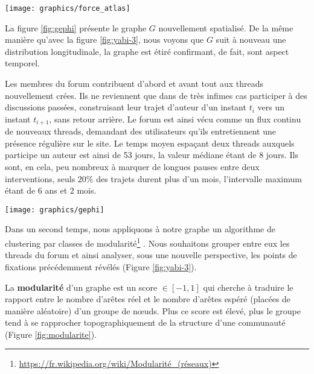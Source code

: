 \documentclass[symmetric,justified,marginals=raggedouter]{tufte-book}
\begin{document}
\begin{marginfigure}%
  \texttt{[image: graphics/force\_atlas]}
  \vspace*{0.2cm}  
  \caption{Principe de base de Force Atlas, les noeuds d'un graphe sont chargés d'une force de répulsion et les arcs d'une force d'attraction}
  \label{fig:force_atlas}
\end{marginfigure} 

La figure \ref{fig:gephi} présente le graphe $G$ nouvellement spatialisé. De la même manière qu'avec la figure \ref{fig:yabi-3}, nous voyons que $G$ suit à nouveau une distribution longitudinale, la graphe est étiré confirmant, de fait, sont aspect temporel. 

Les membres du forum contribuent d'abord et avant tout aux threads nouvellement crées. Ils ne reviennent que dans de très infimes cas participer à des discussions passées, construisant leur trajet d'auteur d'un instant $t_i$ vers un instant $t_{i+1}$, sans retour arrière. Le forum est ainsi vécu comme un flux continu de nouveaux threads, demandant des utilisateurs qu'ils entretiennent une présence régulière sur le site. Le temps moyen espaçant deux threads auxquels participe un auteur est ainsi de 53 jours, la valeur médiane étant de 8 jours. Ils sont, en cela, peu nombreux à marquer de longues pauses entre deux interventions, seuls $20\%$ des trajets durent plus d'un mois, l'intervalle maximum étant de 6 ans et 2 mois.   

\begin{figure*}
  \texttt{[image: graphics/gephi]}
  \caption{Spatialisation du graphe $G$ par \textit{force atlas} et clustering des threads par classes de modularité}
  \label{fig:gephi}
\end{figure*} 

\noindent Dans un second temps, nous appliquons à notre graphe un algorithme de clustering par classes de modularité\footnote{\url{https://fr.wikipedia.org/wiki/Modularité\_(réseaux)}} \citep{blondel_fast_2008}. Nous souhaitons grouper entre eux les threads du forum et ainsi analyser, sous une nouvelle perspective, les points de fixations précédemment révélés (Figure \ref{fig:yabi-3}). 

La \textbf{modularité} d'un graphe est un score $\in [-1,1]$ qui cherche à traduire le rapport entre le nombre d'arêtes réel et le nombre d'arêtes espéré (placées de manière aléatoire) d'un groupe de nœuds. Plus ce score est élevé, plus le groupe tend à se rapprocher topographiquement de la structure d'une communauté (Figure \ref{fig:modularite}).
\end{document}
